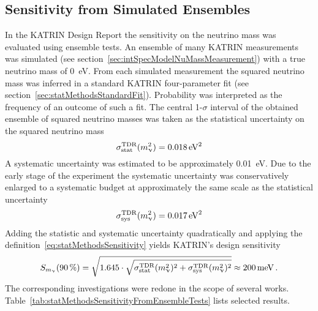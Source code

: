 \subsection{Sensitivity from Simulated Ensembles}
\label{sec:statMethodsSensitivtyFromEnsemble}
In the KATRIN Design Report the sensitivity on the neutrino mass was evaluated using ensemble tests. An ensemble of many KATRIN measurements was simulated (see section~\ref{sec:intSpecModelNuMassMeasurement}) with a true neutrino mass of \SI{0}{eV}. From each simulated measurement the squared neutrino mass was inferred in a standard KATRIN four-parameter fit (see section~\ref{sec:statMethodsStandardFit}). Probability was interpreted as the frequency of an outcome of such a fit. The central 1-$\sigma$ interval of the obtained ensemble of squared neutrino masses was taken as the statistical uncertainty on the squared neutrino mass~\cite{Angrik:2005ep}
\begin{equation}
	\sigma_\mathrm{stat}^\mathrm{TDR}(m_\upnu^2) = \SI{0.018}{eV^2}
\end{equation}
A systematic uncertainty was estimated to be approximately \SI{0.01}{eV}. Due to the early stage of the experiment the systematic uncertainty was conservatively enlarged to a systematic budget at approximately the same scale as the statistical uncertainty~\cite{Angrik:2005ep}
\begin{equation}
	\sigma_\mathrm{sys}^\mathrm{TDR}(m_\upnu^2) = \SI{0.017}{eV^2}
\end{equation}
Adding the statistic and systematic uncertainty quadratically and applying the definition~\eqref{eq:statMethodsSensitivity} yields KATRIN's design sensitivity~\cite{Angrik:2005ep}
\begin{equation}
	\label{eq:statMethodsSensitivityDesignReport}
	S_{m_\upnu}(\SI{90}{\percent}) = 
	\sqrt{1.645\cdot
		\sqrt{
		\sigma_\mathrm{stat}^\mathrm{TDR}(m_\upnu^2)^2+\sigma_\mathrm{sys}^\mathrm{TDR}(m_\upnu^2)^2
	}}
	\approx \SI{200}{meV}
	\text{\,.}
\end{equation}
The corresponding investigations were redone in the scope of several works. Table~\ref{tab:statMethodsSensitivityFromEnsembleTests} lists selected results.
